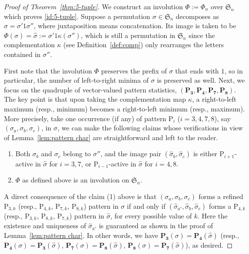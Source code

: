 \documentclass[12pt,reqno]{article}
\numberwithin{equation}{section}
\theoremstyle{plain}
\theoremstyle{definition}
\def\fS{\mathfrak{S}}
\def\rP{\mathrm{P}}
\begin{document}
\begin{proof}[Proof of Theorem~\ref{thm:5-tuple}]
We construct an involution $\Phi:=\Phi_n$ over $\fS_n$ which proves \eqref{id:5-tuple}. Suppose a permutation $\sigma \in \fS_n$ decomposes as $\sigma=\sigma'1\sigma''$, where juxtaposition means concatenation. Its image is taken to be $\Phi(\sigma)=\hat{\sigma}:=\sigma'1\kappa(\sigma'')$, which is still a permutation in $\fS_n$ since the complementation $\kappa$ (see Definition~\ref{def:comp}) only rearranges the letters contained in $\sigma''$. 

First note that the involution $\Phi$ preserves the prefix of $\sigma$ that ends with $1$, so in particular, the number of left-to-right minima of $\sigma$ is preserved as well. Next, we focus on the quadruple of vector-valued pattern statistics, $(\mathbf{P_3},\mathbf{P_4},\mathbf{P_7},\mathbf{P_8})$. The key point is that upon taking the complementation map $\kappa$, a right-to-left maximum (resp., minimum) becomes a right-to-left minimum (resp., maximum). More precisely, take one occurrence (if any) of pattern $\rP_i$ ($i=3,4,7,8$), say $(\sigma_a,\sigma_b,\sigma_c)$, in $\sigma$, we can make the following claims whose verifications in view of Lemma~\ref{lem:pattern char} are straightforward and left to the reader.
\begin{enumerate}
	\item Both $\sigma_b$ and $\sigma_c$ belong to $\sigma''$, and the image pair $(\hat{\sigma}_b,\hat{\sigma}_c)$ is either $\rP_{i+1}$-active in $\hat{\sigma}$ for $i=3,7$, or $\rP_{i-1}$-active in $\hat{\sigma}$ for $i=4,8$.
  \item $\Phi$ as defined above is an involution on $\fS_n$.
\end{enumerate}

A direct consequence of the claim (1) above is that $(\sigma_a,\sigma_b,\sigma_c)$ forms a refined $\rP_{3,k}$ (resp., $\rP_{4,k}$, $\rP_{7,k}$, $\rP_{8,k}$) pattern in $\sigma$ if and only if $(\hat{\sigma}_{a'},\hat{\sigma}_b,\hat{\sigma}_c)$ forms a $\rP_{4,k}$ (resp., $\rP_{3,k}$, $\rP_{8,k}$, $\rP_{7,k}$) pattern in $\hat{\sigma}$, for every possible value of $k$. Here the existence and uniqueness of $\hat{\sigma}_{a'}$ is guaranteed as shown in the proof of Lemma~\ref{lem:pattern char}. In other words, we have $\mathbf{P_3}(\sigma)=\mathbf{P_4}(\hat{\sigma})$ (resp., $\mathbf{P_4}(\sigma)=\mathbf{P_3}(\hat{\sigma})$, $\mathbf{P_7}(\sigma)=\mathbf{P_8}(\hat{\sigma})$, $\mathbf{P_8}(\sigma)=\mathbf{P_7}(\hat{\sigma})$), as desired.
\end{proof}
\end{document}
